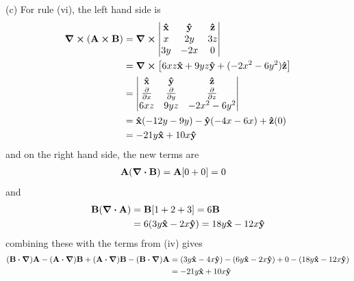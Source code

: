 \documentclass[../main.tex]{subfiles}
\begin{document}
(c) For rule (vi), the left hand side is
\begin{align*}
    \curl(\vb{A} \cp \vb{B}) &= \curl \begin{vmatrix}
        \vu{x} & \vu{y} & \vu{z} \\
        x & 2y & 3z \\
        3y & -2x & 0
    \end{vmatrix} \\
    &= \curl [6xz\vu{x} + 9yz\vu{y} + (-2x^2 - 6y^2)\vu{z}] \\
    &= \begin{vmatrix}
        \vu{x} & \vu{y} & \vu{z} \\
        \pdv{x} & \pdv{y} & \pdv{z} \\
        6xz & 9yz & -2x^2 - 6y^2
    \end{vmatrix} \\
    &= \vu{x} (-12y - 9y) - \vu{y} (-4x - 6x) + \vu{z} (0) \\
    &= -21y\vu{x} + 10x\vu{y}
\end{align*}
and on the right hand side, the new terms are
\begin{align*}
    \vb{A} (\div{\vb{B}}) &= \vb{A} [0 + 0] = 0 
\end{align*}
and
\begin{align*}
    \vb{B} (\div{\vb{A}}) &= \vb{B} [1 + 2 + 3] = 6\vb{B} \\
    &= 6(3y\vu{x} - 2x\vu{y}) = 18y\vu{x} - 12x\vu{y}
\end{align*}
combining these with the terms from (iv) gives
\begin{align*}
    (\vb{B} \vdot \grad) \vb{A} - (\vb{A} \vdot \grad) \vb{B}
    + (\vb{A} \vdot \grad) \vb{B} - (\vb{B} \vdot \grad) \vb{A} &= 
    (3y\vu{x} - 4x\vu{y}) - (6y\vu{x} - 2x\vu{y}) + 0 - (18y\vu{x} - 12x\vu{y}) \\
    &= -21y\vu{x} + 10x\vu{y}
\end{align*}
\end{document}
